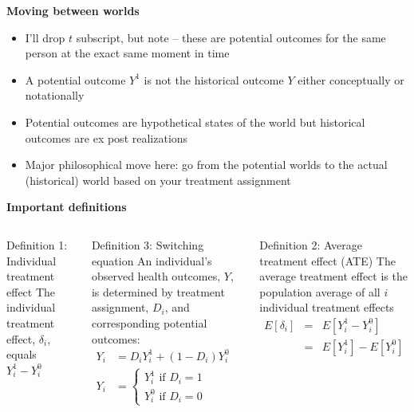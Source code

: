 \documentclass[notes=show]{beamer}
\begin{document}
\begin{frame}[plain]
\begin{center}
\textbf{Moving between worlds}
\end{center}

\begin{itemize}
\item I'll drop $t$ subscript, but note -- these are potential outcomes for the same person at the exact same moment in time
\item A potential outcome $Y^1$ is not the historical outcome $Y$ either conceptually or notationally
\item Potential outcomes are hypothetical states of the world but historical outcomes are ex post realizations
\item Major philosophical move here: go from the potential worlds to the actual (historical) world based on your treatment assignment
\end{itemize}
\end{frame}



\begin{frame}[plain]
	\begin{center}
	\textbf{Important definitions}
	\end{center}


	\begin{columns}[t]
	\scriptsize

	\begin{block}{Definition 1: Individual treatment effect}
	The individual treatment effect,  $\delta_i$, equals $Y_i^1-Y_i^0$
	\end{block}
	\begin{block}{Definition 3: Switching equation}
	An individual's observed health outcomes, $Y$, is determined by treatment assignment, $D_i$, and corresponding potential outcomes:
		      \begin{eqnarray*}
	      Y_i& = D_iY^1_i+(1-D_i)Y^0_i& \\
	      Y_i& = \begin{cases}
	      		Y^1_i\text{ if }D_i=1 \\
			Y^0_i\text{ if }D_i=0
			\end{cases}
	    		\end{eqnarray*}
	\end{block}
	\begin{block}{Definition 2: Average treatment effect (ATE)}
	The average treatment effect is the population average of all $i$ individual treatment effects 
	\begin{eqnarray*}
	E[\delta_i]&=&E[Y_i^1-Y_i^0]\\
	&=&E[Y^1_i] - E[Y^0_i]
	\end{eqnarray*}
	\end{block}
	\end{columns}
\end{frame}
\end{document}
